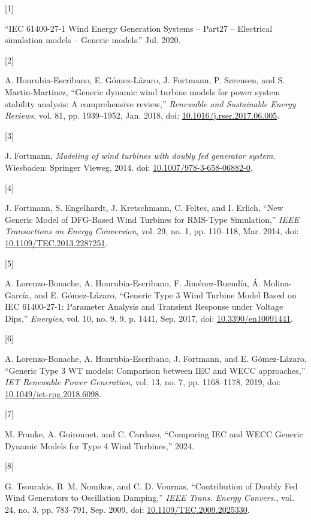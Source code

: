 \documentclass[
  a4paper,
  DIV=11,
  numbers=noendperiod]{scrartcl}
\newlength{\cslhangindent}
\newlength{\csllabelwidth}
\newenvironment{CSLReferences}[2] %
 {\begin{list}{}{%
  \setlength{\itemindent}{0pt}
  \setlength{\leftmargin}{0pt}
  \setlength{\parsep}{0pt}
  \ifodd #1
   \setlength{\leftmargin}{\cslhangindent}
   \setlength{\itemindent}{-1\cslhangindent}
  \fi
  \setlength{\itemsep}{#2\baselineskip}}}
 {\end{list}}
\newcommand{\CSLLeftMargin}[1]{\parbox[t]{\csllabelwidth}{\strut#1\strut}}
\newcommand{\CSLRightInline}[1]{\parbox[t]{\linewidth - \csllabelwidth}{\strut#1\strut}}
\begin{document}
\label{refs}
\begin{CSLReferences}{0}{0}
\CSLLeftMargin{{[}1{]} }%
\CSLRightInline{{``{IEC} 61400-27-1 {Wind Energy Generation Systems} --
{Part27} -- {Electrical} simulation models -- {Generic} models.''} Jul.
2020.}

\CSLLeftMargin{{[}2{]} }%
\CSLRightInline{A. Honrubia-Escribano, E. Gómez-Lázaro, J. Fortmann, P.
Sørensen, and S. Martin-Martinez, {``Generic dynamic wind turbine models
for power system stability analysis: {A} comprehensive review,''}
\emph{Renewable and Sustainable Energy Reviews}, vol. 81, pp.
1939--1952, Jan. 2018, doi:
\href{https://doi.org/10.1016/j.rser.2017.06.005}{10.1016/j.rser.2017.06.005}.}

\CSLLeftMargin{{[}3{]} }%
\CSLRightInline{J. Fortmann, \emph{Modeling of wind turbines with doubly
fed generator system}. Wiesbaden: Springer Vieweg, 2014. doi:
\href{https://doi.org/10.1007/978-3-658-06882-0}{10.1007/978-3-658-06882-0}.}

\CSLLeftMargin{{[}4{]} }%
\CSLRightInline{J. Fortmann, S. Engelhardt, J. Kretschmann, C. Feltes,
and I. Erlich, {``New {Generic Model} of {DFG-Based Wind Turbines} for
{RMS-Type Simulation},''} \emph{IEEE Transactions on Energy Conversion},
vol. 29, no. 1, pp. 110--118, Mar. 2014, doi:
\href{https://doi.org/10.1109/TEC.2013.2287251}{10.1109/TEC.2013.2287251}.}

\CSLLeftMargin{{[}5{]} }%
\CSLRightInline{A. Lorenzo-Bonache, A. Honrubia-Escribano, F.
Jiménez-Buendía, Á. Molina-García, and E. Gómez-Lázaro, {``Generic
{Type} 3 {Wind Turbine Model Based} on {IEC} 61400-27-1: {Parameter
Analysis} and {Transient Response} under {Voltage Dips},''}
\emph{Energies}, vol. 10, no. 9, 9, p. 1441, Sep. 2017, doi:
\href{https://doi.org/10.3390/en10091441}{10.3390/en10091441}.}

\CSLLeftMargin{{[}6{]} }%
\CSLRightInline{A. Lorenzo-Bonache, A. Honrubia-Escribano, J. Fortmann,
and E. Gómez-Lázaro, {``Generic {Type} 3 {WT} models: Comparison between
{IEC} and {WECC} approaches,''} \emph{IET Renewable Power Generation},
vol. 13, no. 7, pp. 1168--1178, 2019, doi:
\href{https://doi.org/10.1049/iet-rpg.2018.6098}{10.1049/iet-rpg.2018.6098}.}

\CSLLeftMargin{{[}7{]} }%
\CSLRightInline{M. Franke, A. Guironnet, and C. Cardozo, {``Comparing
{IEC} and {WECC Generic Dynamic Models} for {Type} 4 {Wind Turbines},''}
2024.}

\CSLLeftMargin{{[}8{]} }%
\CSLRightInline{G. Tsourakis, B. M. Nomikos, and C. D. Vournas,
{``Contribution of {Doubly Fed Wind Generators} to {Oscillation
Damping},''} \emph{IEEE Trans. Energy Convers.}, vol. 24, no. 3, pp.
783--791, Sep. 2009, doi:
\href{https://doi.org/10.1109/TEC.2009.2025330}{10.1109/TEC.2009.2025330}.}

\end{CSLReferences}
\end{document}
